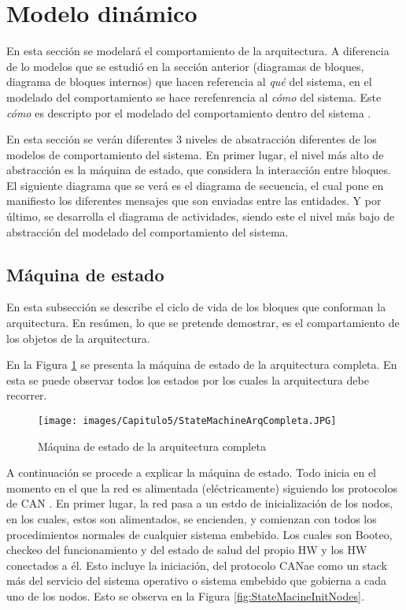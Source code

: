 \section{Modelo dinámico}
En esta sección se modelará el comportamiento de la arquitectura.
A diferencia de lo modelos  que se estudió en la sección anterior (diagramas
de bloques, diagrama de bloques internos) que hacen referencia al
\textit{qué} del sistema, en el modelado del comportamiento se
hace rerefenrencia al \textit{cómo} del sistema. Este \textit{cómo}
es descripto por el modelado del comportamiento dentro del
sistema \citep{HoltPery}.

En esta sección se verán diferentes 3 niveles de absatracción diferentes
de los modelos de comportamiento del sistema. En primer lugar, el
nivel más alto de abstracción es la máquina de estado, que considera la
interacción entre bloques. El siguiente diagrama que se verá es
el diagrama de secuencia, el cual pone en manifiesto los diferentes
mensajes que son enviadas entre las entidades. Y por último, se
desarrolla el diagrama de actividades, siendo este el nivel
más bajo de abstracción del modelado del comportamiento del sistema.

\subsection{Máquina de estado}
En esta subsección se describe el ciclo de vida de los
bloques que conforman la arquitectura. En resúmen, lo que se
pretende demostrar, es el compartamiento de los objetos de la
arquitectura.

En la Figura \ref{fig:StateMachineArqCompleta} se presenta la
máquina de estado de la arquitectura completa.  En esta se
puede observar todos los estados por los cuales la arquitectura
debe recorrer.

\begin{figure}[h!]
 \centering
 \texttt{[image: images/Capitulo5/StateMachineArqCompleta.JPG]}
  \caption{Máquina de estado de la arquitectura completa}
\label{fig:StateMachineArqCompleta}
\end{figure}

A continuación se procede a explicar la máquina de estado. Todo
inicia en el momento en el que la red es alimentada (eléctricamente)
siguiendo los protocolos de CAN \citep{can-ciaWEB}. En primer lugar, la
red pasa a un estdo de inicialización de los nodos, en los cuales, estos
son alimentados, se encienden, y comienzan con todos los procedimientos
normales de cualquier sistema embebido. Los cuales son Booteo, checkeo del
funcionamiento y del estado de salud del propio \ac{HW} y los \ac{HW}
conectados a él. Esto incluye la iniciación, del protocolo CANae como
un stack más del servicio del sistema operativo o sistema embebido
que gobierna a cada uno de los nodos. Esto se observa en la Figura
\ref{fig:StateMacineInitNodes}.


